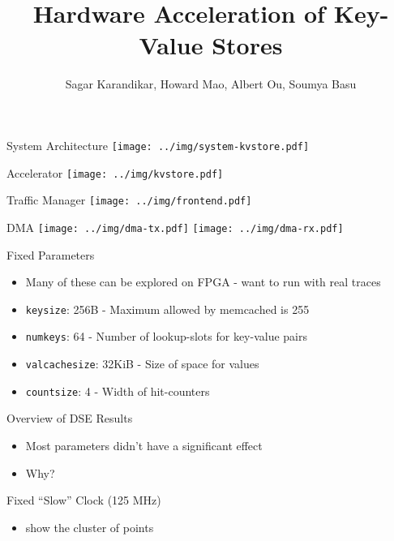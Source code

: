 \documentclass{beamer}
\title{Hardware Acceleration of Key-Value Stores}
\author{Sagar Karandikar, Howard Mao, Albert Ou, Soumya Basu}
\institute[UC Berkeley]{\textsc{University of California, Berkeley}}
\begin{document}
\frame{\titlepage}

\begin{frame}
    
\end{frame}

\begin{frame}{System Architecture}
    \texttt{[image: ../img/system-kvstore.pdf]}
\end{frame}

\begin{frame}{Accelerator}
    \texttt{[image: ../img/kvstore.pdf]}
\end{frame}

\begin{frame}{Traffic Manager}
    \texttt{[image: ../img/frontend.pdf]}
\end{frame}

\begin{frame}{DMA}
    \texttt{[image: ../img/dma-tx.pdf]}
    \texttt{[image: ../img/dma-rx.pdf]}
\end{frame}

\begin{frame}
    
\end{frame}

\begin{frame}{Fixed Parameters}
    \begin{itemize}
        \item Many of these can be explored on FPGA - want to run with real traces
        \item \texttt{keysize}: 256B - Maximum allowed by memcached is 255
        \item \texttt{numkeys}: 64 - Number of lookup-slots for key-value pairs
        \item \texttt{valcachesize}: 32KiB - Size of space for values
        \item \texttt{countsize}: 4 - Width of hit-counters
    \end{itemize}
\end{frame}

\begin{frame}{Overview of DSE Results}
    \begin{itemize}
        \item Most parameters didn't have a significant effect
        \item Why?
    \end{itemize}
\end{frame}


\begin{frame}{Fixed ``Slow'' Clock (125 MHz)}
    \begin{itemize}
        \item show the cluster of points
    \end{itemize}
\end{frame}
\end{document}
